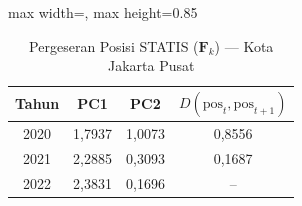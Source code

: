 \begin{table}[H]
\centering
\caption{Pergeseran Posisi STATIS ($\mathbf{F}_k$) --- Kota Jakarta Pusat} \label{tab:sample2jarak_statis_skor_kota_jakarta_pusat}
\begin{adjustbox}{max width=\textwidth, max height=0.85\textheight}
\begin{tabular}{|c|c|c|c|}
\hline
\textbf{Tahun} & \textbf{PC1} & \textbf{PC2} & \textbf{$D(\text{pos}_t, \text{pos}_{t+1})$} \\
\hline
2020 & 1,7937 & 1,0073 & 0,8556 \\
2021 & 2,2885 & 0,3093 & 0,1687 \\
2022 & 2,3831 & 0,1696 & -- \\
\hline
\end{tabular}
\end{adjustbox}
\end{table}